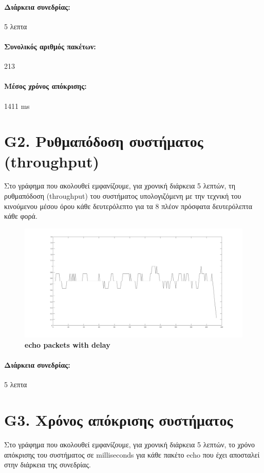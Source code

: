 \documentclass{article}
\begin{document}
\paragraph{Διάρκεια συνεδρίας:} 5 λεπτα
\paragraph{Συνολικός αριθμός πακέτων: }213
\paragraph{Μέσος χρόνος απόκρισης: }1411 ms
\newpage
\large{}
\section*{G2. Ρυθμαπόδοση συστήματος (throughput)}
Στο γράφημα που ακολουθεί εμφανίζουμε, για χρονική διάρκεια 5 λεπτών, τη ρυθμαπόδοση (throughput) του συστήματος υπολογιζόμενη με
την τεχνική του κινούμενου μέσου όρου κάθε δευτερόλεπτο για τα 8 πλέον πρόσφατα δευτερόλεπτα κάθε φορά.

\begin{figure}[h!]
 \begin{center}
  \advance\leftskip-6cm
  \includegraphics[width=240mm,scale=0.7]{g2s1.jpg}
    \caption*{\textbf{echo packets with delay}}
  
\end{center}
\end{figure}
\paragraph{Διάρκεια συνεδρίας:} 5 λεπτα
\newpage
\large{}
\section*{G3. Χρόνος απόκρισης συστήματος}
Στο γράφημα που ακολουθεί εμφανίζουμε, για χρονική διάρκεια 5 λεπτών, το χρόνο απόκρισης του
συστήματος σε milliseconds για κάθε πακέτο echo που έχει αποσταλεί στην διάρκεια της συνεδρίας.
\end{document}
